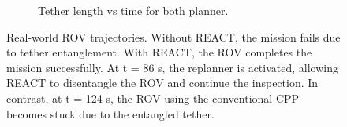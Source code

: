 \begin{figure}[ht]
\begin{subfigure}[b]{0.48\linewidth}
        \caption{Tether length vs time for both planner.}
        \label{fig:traj_react}
    \end{subfigure}
    \caption{Real-world ROV trajectories. Without \ac{REACT}, the mission fails due to tether entanglement. With \ac{REACT}, the ROV completes the mission successfully. At t = 86 s, the replanner is activated, allowing \ac{REACT} to disentangle the \ac{ROV} and continue the inspection. In contrast, at t = 124 s, the \ac{ROV} using the conventional \ac{CPP} becomes stuck due to the entangled tether.}
    \label{fig:realworld_trajectory}
\end{figure}
